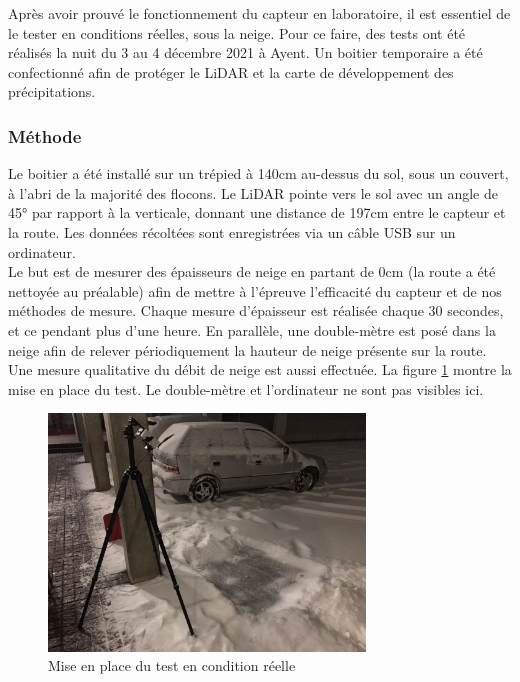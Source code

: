 Après avoir prouvé le fonctionnement du capteur en laboratoire, il est essentiel de le tester en conditions
réelles, sous la neige. Pour ce faire, des tests ont été réalisés la nuit du 3 au 4 décembre 2021 à Ayent.
Un boitier temporaire a été confectionné afin de protéger le LiDAR et la carte de développement des 
précipitations.

\subsubsection{Méthode}

Le boitier a été installé sur un trépied à 140cm au-dessus du sol, sous un couvert, à l'abri de la majorité
des flocons. Le LiDAR pointe vers le sol avec un angle de 45° par rapport à la verticale, donnant une
distance de 197cm entre le capteur et la route. Les données récoltées sont enregistrées via un câble 
USB sur un ordinateur.\\
Le but est de mesurer des épaisseurs de neige en partant de 0cm (la route a été nettoyée au préalable)
afin de mettre à l'épreuve l'efficacité du capteur et de nos méthodes de mesure. Chaque mesure d'épaisseur 
est réalisée chaque 30 secondes, et ce pendant plus d'une heure. En parallèle, une double-mètre est posé 
dans la neige afin de relever périodiquement la hauteur de neige présente sur la route. Une mesure
qualitative du débit de neige est aussi effectuée. La figure \ref{RealTest_Setup} montre la mise en
place du test. Le double-mètre et l'ordinateur ne sont pas visibles ici.

\begin{figure}[H]
    \centering
    \includegraphics[width=0.75\textwidth]{Images/LiDAR/ReadTests_Setup.jpeg}
    \caption{Mise en place du test en condition réelle}
    \label{RealTest_Setup}
\end{figure}

